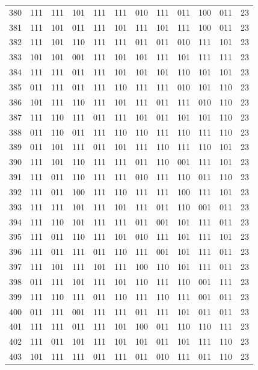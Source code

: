 \begin{longtable}{r*{10}{c}r}
380 & 111 & 111 & 101 & 111 & 111 & 010 & 111 & 011 & 100 & 011 & 23\\
381 & 111 & 101 & 011 & 111 & 101 & 111 & 101 & 111 & 100 & 011 & 23\\
382 & 111 & 101 & 110 & 111 & 111 & 011 & 011 & 010 & 111 & 101 & 23\\
383 & 101 & 101 & 001 & 111 & 101 & 101 & 111 & 101 & 111 & 111 & 23\\
384 & 111 & 111 & 011 & 111 & 101 & 101 & 101 & 110 & 101 & 101 & 23\\
385 & 011 & 111 & 011 & 111 & 110 & 111 & 111 & 010 & 101 & 110 & 23\\
386 & 101 & 111 & 110 & 111 & 101 & 111 & 011 & 111 & 010 & 110 & 23\\
387 & 111 & 110 & 111 & 011 & 111 & 101 & 011 & 101 & 101 & 110 & 23\\
388 & 011 & 110 & 011 & 111 & 110 & 110 & 111 & 110 & 111 & 110 & 23\\
389 & 011 & 101 & 111 & 011 & 101 & 111 & 110 & 111 & 110 & 101 & 23\\
390 & 111 & 101 & 110 & 111 & 111 & 011 & 110 & 001 & 111 & 101 & 23\\
391 & 111 & 011 & 110 & 111 & 111 & 010 & 111 & 110 & 011 & 110 & 23\\
392 & 111 & 011 & 100 & 111 & 110 & 111 & 111 & 100 & 111 & 101 & 23\\
393 & 111 & 111 & 101 & 111 & 101 & 111 & 011 & 110 & 001 & 011 & 23\\
394 & 111 & 110 & 101 & 111 & 111 & 011 & 001 & 101 & 111 & 011 & 23\\
395 & 111 & 011 & 110 & 111 & 101 & 010 & 111 & 101 & 111 & 101 & 23\\
396 & 111 & 011 & 111 & 011 & 110 & 111 & 001 & 101 & 111 & 011 & 23\\
397 & 111 & 101 & 111 & 101 & 111 & 100 & 110 & 101 & 111 & 011 & 23\\
398 & 011 & 111 & 101 & 111 & 101 & 110 & 111 & 110 & 001 & 111 & 23\\
399 & 111 & 110 & 111 & 011 & 110 & 111 & 110 & 111 & 001 & 011 & 23\\
400 & 011 & 111 & 001 & 111 & 111 & 011 & 111 & 101 & 011 & 011 & 23\\
401 & 111 & 111 & 011 & 111 & 101 & 100 & 011 & 110 & 110 & 111 & 23\\
402 & 111 & 011 & 101 & 111 & 101 & 101 & 011 & 101 & 111 & 110 & 23\\
403 & 101 & 111 & 111 & 011 & 111 & 011 & 010 & 111 & 011 & 110 & 23\\

\end{longtable}
